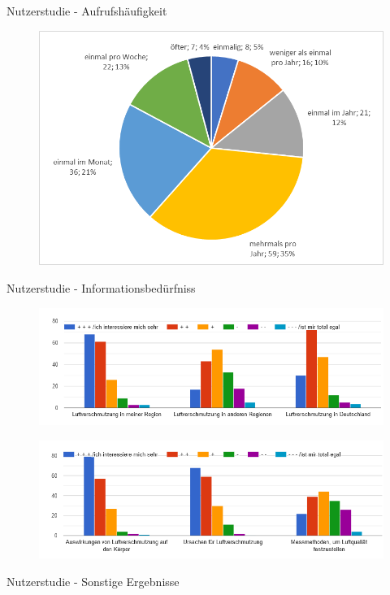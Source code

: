 \begin{frame}{Nutzerstudie - Aufrufshäufigkeit}
    \begin{figure}[h]
        \includegraphics[height=0.7\textheight]{../../media/diagram/aufrufe}
    \end{figure}
\end{frame}
\begin{frame}{Nutzerstudie - Informationsbedürfniss}
    \begin{figure}[h]
        \includegraphics[height=0.35\textheight]{../../media/diagram/interesse}
    \end{figure}
    \begin{figure}[h]
        \includegraphics[height=0.35\textheight]{../../media/diagram/interesse2}
    \end{figure}
\end{frame}
\begin{frame}{Nutzerstudie - Sonstige Ergebnisse}
    
\end{frame}